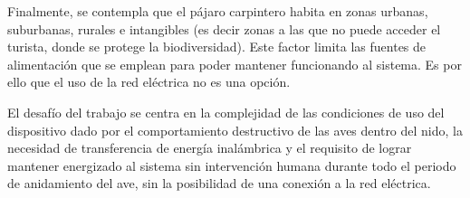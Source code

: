 Finalmente, se contempla que el pájaro carpintero habita en zonas urbanas, suburbanas, rurales e intangibles (es decir zonas a las que no puede acceder el turista, donde se protege la biodiversidad). Este factor limita las fuentes de alimentación que se emplean para poder mantener funcionando al sistema. Es por ello que el uso de la red eléctrica no es una opción.

El desafío del trabajo se centra en la complejidad de las condiciones de uso del dispositivo dado por el comportamiento destructivo de las aves dentro del nido, la necesidad de transferencia de energía inalámbrica y el requisito de lograr mantener energizado al sistema sin intervención humana durante todo el periodo de anidamiento del ave, sin la posibilidad de una conexión a la red eléctrica.